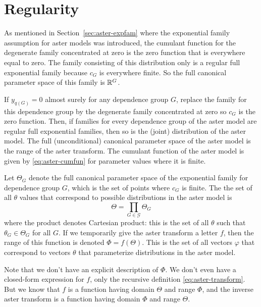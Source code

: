 
\chapter{Regularity}

As mentioned in Section~\ref{sec:aster-expfam} where the exponential
family assumption for aster models was introduced, the cumulant function
for the degenerate family concentrated at zero is the zero function
that is everywhere equal to zero.  The family consisting of this distribution
only is a regular full exponential family because $c_G$ is everywhere finite.
So the full canonical parameter space of this family is $\mathbb{R}^G$.

\begin{theorem} \label{th:regular}
If $y_{q(G)} = 0$ almost surely for any dependence group $G$, replace
the family for this dependence group by the degenerate family concentrated
at zero so $c_G$ is the zero function.
Then, if families for every dependence group of the aster model are regular full
exponential families, then so is the (joint) distribution of the aster model.
The full (unconditional) canonical parameter space of the aster model
is the range of the aster transform.  The cumulant function of the
aster model is given by \eqref{eq:aster-cumfun} for parameter values where
it is finite.
\end{theorem}

Let $\Theta_G$ denote the full canonical parameter space of the exponential
family for dependence group $G$, which is the set of points where $c_G$
is finite.  The the set of all $\theta$ values that correspond to possible
distributions in the aster model is
\begin{equation} \label{eq:reg-prod}
   \Theta = \prod_{G \in \mathcal{G}} \Theta_G
\end{equation}
where the product denotes Cartesian product: this is the set of all $\theta$
such that $\theta_G \in \Theta_G$ for all $G$.
If we temporarily give the aster transform a letter $f$, then
the range of this function is denoted $\Phi = f(\Theta)$.
This is the set of all vectors $\varphi$ that correspond to vectors $\theta$
that parameterize distributions in the aster model.

Note that we don't have an explicit description of $\Phi$.
We don't even have a closed-form expression for $f$, only the recursive
definition \eqref{eq:aster-transform}.  But we know that $f$ is a function
having domain $\Theta$ and range $\Phi$, and the inverse aster transform
is a function having domain $\Phi$ and range $\Theta$.

